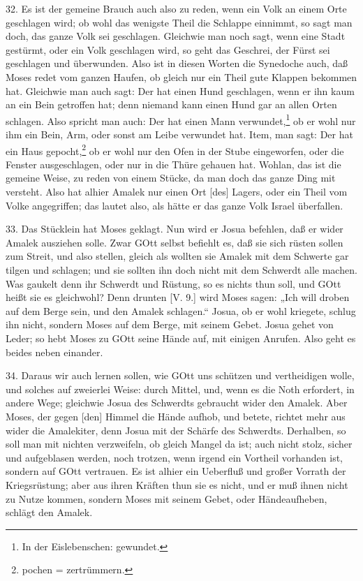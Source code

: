 32. Es ist der gemeine Brauch auch also zu reden, wenn ein Volk an einem Orte geschlagen wird; ob wohl das wenigste Theil die Schlappe einnimmt, so sagt man doch, das ganze Volk sei geschlagen. Gleichwie man noch sagt, wenn eine Stadt gestürmt, oder ein Volk geschlagen wird, so geht das Geschrei, der Fürst sei geschlagen und überwunden. Also ist in diesen Worten die Synedoche auch, daß Moses redet vom ganzen Haufen, ob gleich nur ein Theil gute Klappen bekommen hat. Gleichwie man auch sagt: Der hat einen Hund geschlagen, wenn er ihn kaum an ein Bein getroffen hat; denn niemand kann einen Hund gar an allen Orten schlagen. Also spricht man auch: Der hat einen Mann verwundet,\footnote{In der Eislebenschen: gewundet.} ob er wohl nur ihm ein Bein, Arm, oder sonst am Leibe verwundet hat. Item, man sagt: Der hat ein Haus gepocht,\footnote{pochen = zertrümmern.} ob er wohl nur den Ofen in der Stube eingeworfen, oder die Fenster ausgeschlagen, oder nur in die Thüre gehauen hat. Wohlan, das ist die gemeine Weise, zu reden von einem Stücke, da
man doch das ganze Ding mit versteht. Also hat alhier Amalek nur einen Ort [des] Lagers, oder ein Theil vom Volke angegriffen; das lautet also, als hätte er das ganze Volk Israel überfallen.

33. Das Stücklein hat Moses geklagt. Nun wird er Josua befehlen, daß er wider Amalek ausziehen solle. Zwar GOtt selbst befiehlt es, daß sie sich rüsten sollen zum Streit, und also stellen, gleich als wollten sie Amalek mit dem Schwerte gar tilgen und schlagen; und sie sollten ihn doch nicht mit dem Schwerdt alle machen. Was gaukelt denn ihr Schwerdt und Rüstung, so es nichts thun soll, und GOtt heißt sie es gleichwohl? Denn drunten [V. 9.] wird Moses sagen: „Ich will droben auf dem Berge sein, und den Amalek schlagen.“ Josua, ob er wohl kriegete, schlug ihn nicht, sondern Moses auf dem Berge, mit seinem Gebet. Josua gehet von Leder; so hebt Moses zu GOtt seine Hände auf, mit einigen Anrufen. Also geht es beides neben einander.

34. Daraus wir auch lernen sollen, wie GOtt uns schützen und vertheidigen wolle, und solches auf zweierlei Weise: durch Mittel, und, wenn es die Noth erfordert, in andere Wege; gleichwie Josua des Schwerdts gebraucht wider den Amalek. Aber Moses, der gegen [den] Himmel die Hände aufhob, und betete, richtet mehr aus wider die Amalekiter, denn Josua mit der Schärfe des Schwerdts. Derhalben, so soll man mit nichten verzweifeln, ob gleich Mangel da ist; auch nicht stolz, sicher und aufgeblasen werden, noch trotzen, wenn irgend ein Vortheil vorhanden ist, sondern auf GOtt vertrauen. Es ist alhier ein Ueberfluß und großer Vorrath der Kriegsrüstung; aber aus ihren Kräften thun sie es nicht, und er muß ihnen nicht zu Nutze kommen, sondern Moses mit seinem Gebet, oder Händeaufheben, schlägt den Amalek.

